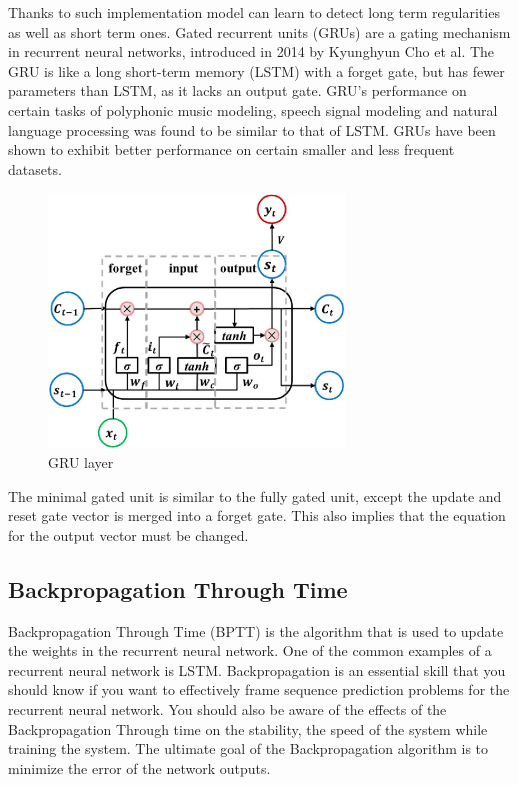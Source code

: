 Thanks to such implementation model can learn to detect long term regularities as well
as short term ones.
Gated recurrent units (GRUs) are a gating mechanism in recurrent neural networks,
introduced in 2014 by Kyunghyun Cho et al.
The GRU is like a long short-term memory (LSTM) with a forget gate, but has fewer parameters 
than LSTM, as it lacks an output gate. GRU's performance on certain tasks of polyphonic music
modeling, speech signal modeling and natural language processing was found to be similar 
to that of LSTM. GRUs have been shown to exhibit better performance on certain smaller and less
frequent datasets.
\begin{figure}[htb] 
	\label{fig:gru}
	\includegraphics[width=0.7\textwidth]{figures/gru}
	\caption{GRU layer}
\end{figure}
The minimal gated unit is similar to the fully gated unit, except the update and reset gate vector
is merged into a forget gate. This also implies that the equation for the output vector 
must be changed.

\subsection{Backpropagation Through Time}
\FloatBarrier
Backpropagation Through Time (BPTT) is the algorithm that is used to update the weights in the 
recurrent neural network. 
One of the common examples of a recurrent neural network is LSTM. 
Backpropagation is an essential skill that you should know if you want to effectively frame 
sequence prediction problems for the recurrent neural network. You should also be aware of the
effects of the Backpropagation Through time on the stability, the speed of the system while 
training the system.
The ultimate goal of the Backpropagation algorithm is to minimize the error of the network outputs.

